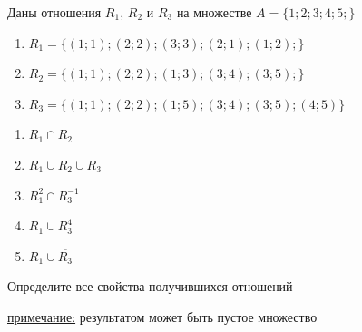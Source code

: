 \question
Даны отношения $R_1$, $R_2$ и $R_3$ на множестве $A = \{1; 2; 3; 4; 5;\}$ 
\begin{enumerate}
	\renewcommand{\labelenumi}{\alph{enumi})}
	\item $R_1 = \{(1; 1); (2; 2); (3; 3); (2; 1); (1; 2); \}$
	\item $R_2 = \{(1; 1); (2; 2); (1; 3); (3; 4); (3; 5);\}$
	\item $R_3 = \{(1; 1); (2; 2);  (1; 5); (3; 4); (3; 5); (4; 5)\}$
\end{enumerate}

\begin{enumerate}
	\renewcommand{\labelenumi}{\alph{enumi})}
	\item $R_1 \cap R_2$
	\item $R_1 \cup R_2 \cup R_3$
	\item $R_1^2 \cap R_3^{-1}$
	\item $R_1 \cup R_3^4$
	\item $R_1 \cup \overline{R_3}$
\end{enumerate}

Определите все свойства получившихся отношений

\underline{примечание:} результатом может быть пустое множество